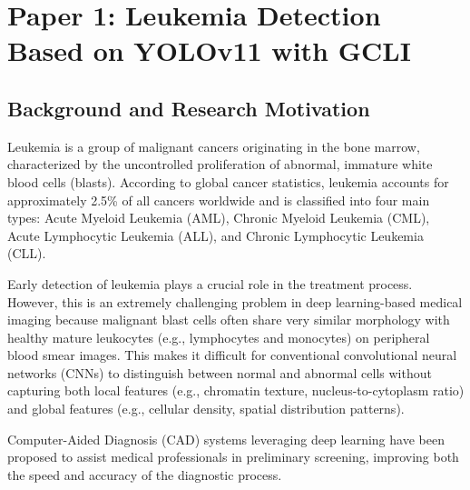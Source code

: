 
\section{Paper 1: Leukemia Detection Based on YOLOv11 with GCLI}
\label{sec:leukemia}


\subsection{Background and Research Motivation}
Leukemia is a group of malignant cancers originating in the bone marrow, characterized by the uncontrolled proliferation of abnormal, immature white blood cells (blasts). According to global cancer statistics, leukemia accounts for approximately 2.5\% of all cancers worldwide and is classified into four main types: Acute Myeloid Leukemia (AML), Chronic Myeloid Leukemia (CML), Acute Lymphocytic Leukemia (ALL), and Chronic Lymphocytic Leukemia (CLL).

Early detection of leukemia plays a crucial role in the treatment process. However, this is an extremely challenging problem in deep learning-based medical imaging because malignant blast cells often share very similar morphology with healthy mature leukocytes (e.g., lymphocytes and monocytes) on peripheral blood smear images. This makes it difficult for conventional convolutional neural networks (CNNs) to distinguish between normal and abnormal cells without capturing both local features (e.g., chromatin texture, nucleus-to-cytoplasm ratio) and global features (e.g., cellular density, spatial distribution patterns).

Computer-Aided Diagnosis (CAD) systems leveraging deep learning have been proposed to assist medical professionals in preliminary screening, improving both the speed and accuracy of the diagnostic process.

